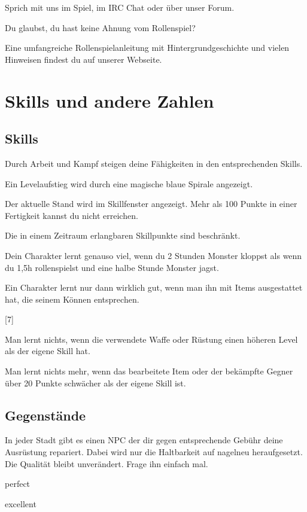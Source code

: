 \documentclass[a4paper,11pt]{book}
\begin{document}
Sprich mit uns im Spiel, im IRC Chat oder über unser Forum.

Du glaubst, du hast keine Ahnung vom Rollenspiel?



Eine umfangreiche Rollenspielanleitung mit Hintergrundgeschichte und vielen Hinweisen findest du auf unserer Webseite.



\chapter{Skills und andere Zahlen}

\section{Skills}

Durch Arbeit und Kampf steigen deine Fähigkeiten in den entsprechenden Skills.

Ein Levelaufstieg wird durch eine magische blaue Spirale angezeigt.

Der aktuelle Stand wird im Skillfenster angezeigt. Mehr als 100 Punkte in einer Fertigkeit kannst du nicht erreichen.

Die in einem Zeitraum erlangbaren Skillpunkte sind beschränkt.

Dein Charakter lernt genauso viel, wenn du 2 Stunden Monster kloppst als  wenn du 1,5h rollenspielst und eine halbe Stunde Monster jagst.

Ein Charakter lernt nur dann wirklich gut, wenn man ihn mit Items ausgestattet hat, die seinem Können entsprechen.

[7]

Man lernt nichts, wenn die verwendete Waffe oder Rüstung einen höheren Level als der eigene Skill hat.

Man lernt nichts mehr, wenn das bearbeitete Item oder der bekämpfte Gegner über 20 Punkte schwächer als der eigene Skill ist.

\section{Gegenstände}

In jeder Stadt gibt es einen NPC der dir gegen entsprechende Gebühr deine Ausrüstung repariert. Dabei wird nur die Haltbarkeit auf nagelneu heraufgesetzt. Die Qualität bleibt unverändert. Frage ihn einfach mal.

perfect

excellent
\end{document}
